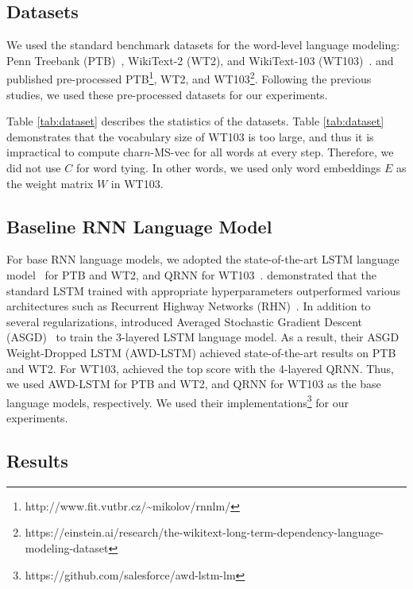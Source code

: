 \documentclass[letterpaper]{article} %
\begin{document}
\subsection{Datasets}
We used the standard benchmark datasets for the word-level language modeling: Penn Treebank (PTB)~\cite{Marcus:1993:BLA:972470.972475}, WikiText-2 (WT2), and WikiText-103 (WT103)~\cite{DBLP:journals/corr/MerityXBS16}.
\cite{DBLP:conf/interspeech/MikolovKBCK10} and \cite{DBLP:journals/corr/MerityXBS16} published pre-processed PTB\footnote{http://www.fit.vutbr.cz/\~{}mikolov/rnnlm/}, WT2, and WT103\footnote{https://einstein.ai/research/the-wikitext-long-term-dependency-language-modeling-dataset}.
Following the previous studies, we used these pre-processed datasets for our experiments.



Table \ref{tab:dataset} describes the statistics of the datasets.
Table \ref{tab:dataset} demonstrates that the vocabulary size of WT103 is too large, and thus it is impractical to compute char$n$-MS-vec for all words at every step.
Therefore, we did not use $C$ for word tying.
In other words, we used only word embeddings $E$ as the weight matrix $W$ in WT103.



\subsection{Baseline RNN Language Model}
For base RNN language models, we adopted the state-of-the-art LSTM language model~\cite{merityRegOpt} for PTB and WT2, and QRNN for WT103~\cite{DBLP:journals/corr/BradburyMXS16}.
\cite{DBLP:journals/corr/MelisDB17} demonstrated that the standard LSTM trained with appropriate hyperparameters outperformed various architectures such as Recurrent Highway Networks (RHN)~\cite{zilly2016recurrent}.
In addition to several regularizations, \cite{merityRegOpt} introduced Averaged Stochastic Gradient Descent (ASGD)~\cite{polyak1992acceleration} to train the 3-layered LSTM language model.
As a result, their ASGD Weight-Dropped LSTM (AWD-LSTM) achieved state-of-the-art results on PTB and WT2.
For WT103, \cite{merityAnalysis} achieved the top score with the 4-layered QRNN.
Thus, we used AWD-LSTM for PTB and WT2, and QRNN for WT103 as the base language models, respectively.
We used their implementations\footnote{https://github.com/salesforce/awd-lstm-lm} for our experiments.

\subsection{Results}
\end{document}
